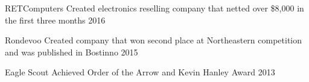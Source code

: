 

\begin{cvhonors}

  \cvhonor
    {RETComputers} %
    {Created electronics reselling company that netted over \$8,000 in the first three months} %
    {} %
    {2016} %

  \cvhonor
    {Rondevoo} %
    {Created company that won second place at Northeastern competition and was published in Bostinno} %
    {} %
    {2015} %

  \cvhonor
    {Eagle Scout} %
    {Achieved Order of the Arrow and Kevin Hanley Award} %
    {} %
    {2013} %

\end{cvhonors}

